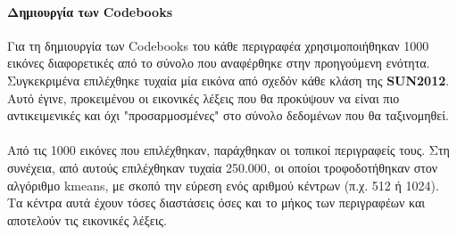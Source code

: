 \paragraph*{Δημιουργία των Codebooks}
Για τη δημιουργία των Codebooks του κάθε περιγραφέα χρησιμοποιήθηκαν 1000 εικόνες διαφορετικές από το σύνολο που αναφέρθηκε στην προηγούμενη ενότητα. Συγκεκριμένα επιλέχθηκε τυχαία μία εικόνα από σχεδόν κάθε κλάση της \textbf{SUN2012}. Αυτό έγινε, προκειμένου οι εικονικές λέξεις που θα προκύψουν να είναι πιο αντικειμενικές και όχι "προσαρμοσμένες" στο σύνολο δεδομένων που θα ταξινομηθεί.

\paragraph*{}
Από τις 1000 εικόνες που επιλέχθηκαν, παράχθηκαν οι τοπικοί περιγραφείς τους. Στη συνέχεια, από αυτούς επιλέχθηκαν τυχαία 250.000, οι οποίοι τροφοδοτήθηκαν στον αλγόριθμο kmeans, με σκοπό την εύρεση ενός αριθμού κέντρων (π.χ. 512 ή 1024). Τα κέντρα αυτά έχουν τόσες διαστάσεις όσες και το μήκος των περιγραφέων και αποτελούν τις εικονικές λέξεις.



